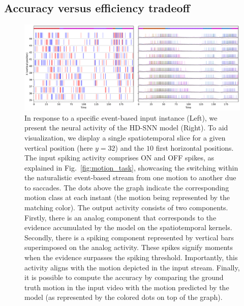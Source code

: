 \documentclass[default]{sn-jnl}%
\theoremstyle{thmstyleone}%
\theoremstyle{thmstyletwo}%
\theoremstyle{thmstylethree}%
\begin{document}
\subsection{Accuracy versus efficiency tradeoff}%
%
\begin{figure}%
    \centering
    \includegraphics[width=0.95\linewidth]{figures/conv_HD-SNN.pdf}
    \caption{
        In response to a specific event-based input instance (Left), we present the neural activity of the HD-SNN model (Right). To aid visualization, we display a single spatiotemporal slice for a given vertical position (here $y = 32$) and the $10$ first horizontal positions. The input spiking activity comprises ON and OFF spikes, as explained in Fig.~\ref{fig:motion_task}, showcasing the switching within the naturalistic event-based stream from one motion to another due to saccades. The dots above the graph indicate the corresponding motion class at each instant (the motion being represented by the matching color). The output activity consists of two components. Firstly, there is an analog component that corresponds to the evidence accumulated by the model on the spatiotemporal kernels. Secondly, there is a spiking component represented by vertical bars superimposed on the analog activity. These spikes signify moments when the evidence surpasses the spiking threshold. Importantly, this activity aligns with the motion depicted in the input stream. Finally, it is possible to compute the accuracy by comparing the ground truth motion in the input video with the motion predicted by the model (as represented by the colored dots on top of the graph).
        }
    \label{fig:activity}
\end{figure}
%
\end{document}
